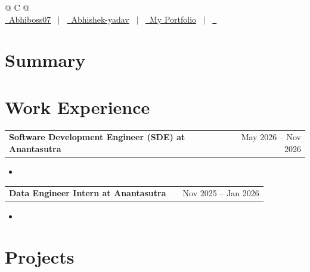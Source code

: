 \documentclass[a4paper,10pt]{article}
\makeatletter
\newenvironment{joblong}[2]
    {
    \begin{tabularx}{\linewidth}{@{}l X r@{}}
    \textbf{#1} & \hfill &  #2 \\[3.50pt]
    \end{tabularx}
    \begin{minipage}[t]{\linewidth}
    \begin{itemize}[nosep,after=\strut, leftmargin=1em, itemsep=3pt,label=--]
    }
    {
    \end{itemize}
    \end{minipage}
    }
\makeatother
\begin{document}
\pagestyle{empty}

\begin{tabularx}{\linewidth}{@{} C @{}}
\Huge{}\\[7.5pt]
\href{\VAR{github}}{\raisebox{-0.05\height}\faGithub\ Abhiboss07} \ $|$ \
\href{\VAR{linkedin}}{\raisebox{-0.05\height}\faLinkedin\ Abhishek-yadav} \ $|$ \
\href{\VAR{portfolio}}{\raisebox{-0.05\height}\faGlobe \ My Portfolio} \ $|$ \
\href{mailto:\VAR{email}}{\raisebox{-0.05\height}\faEnvelope \ } \ \ \\
\end{tabularx}

\section{Summary}

\section{Work Experience}

\begin{joblong}{Software Development Engineer (SDE) at Anantasutra}{May 2026 -- Nov 2026}
\item {}
\end{joblong}

\begin{joblong}{Data Engineer Intern at Anantasutra}{Nov 2025 -- Jan 2026}
\item {}
\BLOCK{endfor}
\end{joblong}

\section{Projects}
\end{document}
